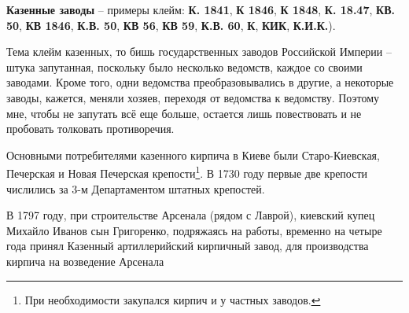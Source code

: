 \noindent\textbf{Казенные заводы} – примеры клейм: \textbf{К. 1841}, \textbf{К 1846}, \textbf{К 1848}, \textbf{К. 18.47}, \textbf{КВ. 50}, \textbf{КВ 1846}, \textbf{К.В. 50}, \textbf{КВ 56}, \textbf{КВ 59}, \textbf{К.В. 60}, \textbf{К}, \textbf{КИК}, \textbf{К.И.К.}).

Тема клейм казенных, то бишь государственных заводов Российской Империи – штука запутанная, поскольку было несколько ведомств, каждое со своими заводами. Кроме того, одни ведомства преобразовывались в другие, а некоторые заводы, кажется, меняли хозяев, переходя от ведомства к ведомству. Поэтому мне, чтобы не запутать всё еще больше, остается лишь повествовать и не пробовать толковать противоречия.

Основными потребителями казенного кирпича в Киеве были Старо-Киевская, Печерская и Новая Печерская крепости\footnote{При необходимости закупался кирпич и у частных заводов.}. В 1730 году первые две крепости числились за 3-м Департаментом штатных крепостей.

В 1797 году, при строительстве Арсенала (рядом с Лаврой), киевский купец Михайло Иванов сын Григоренко, подряжаясь на работы, временно на четыре года принял Казенный артиллерийский кирпичный завод, для производства кирпича на возведение Арсенала

